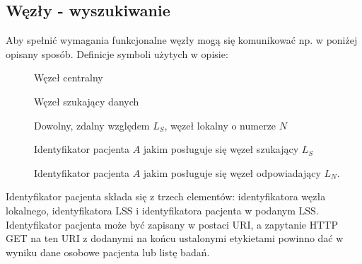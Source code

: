 \documentclass[a4paper]{report}
\begin{document}
\subsection{Węzły - wyszukiwanie}

Aby spełnić wymagania funkcjonalne węzły mogą się komunikować np. w poniżej opisany sposób.
Definicje symboli użytych w opisie:
\begin{description}
  \item[] Węzeł centralny
  \item[] Węzeł szukający danych
  \item[] Dowolny, zdalny względem $L_S$, węzeł lokalny o numerze $N$
  \item[] Identyfikator pacjenta $A$ jakim posługuje się węzeł szukający $L_S$
  \item[] Identyfikator pacjenta $A$ jakim posługuje się węzeł odpowiadający $L_N$.
\end{description}

Identyfikator pacjenta składa się z trzech elementów: identyfikatora węzła lokalnego, identyfikatora LSS i identyfikatora
pacjenta w podanym LSS. Identyfikator pacjenta może być zapisany w postaci URI, a zapytanie HTTP GET na
ten URI z dodanymi na końcu ustalonymi etykietami powinno dać w wyniku dane osobowe pacjenta lub listę badań.
  
\end{document}
